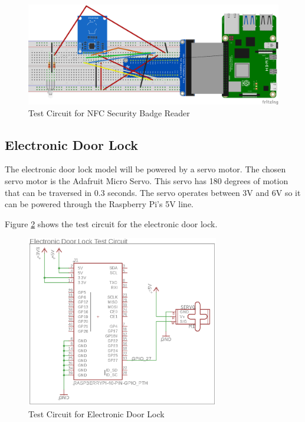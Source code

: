 \begin{figure}[!htb]
\centering
\includegraphics[width=\textwidth]{images/nfc-test-circuit.png}
\caption{Test Circuit for NFC Security Badge Reader}
\label{fig:nfc-test-circuit}
\end{figure}

\subsection{Electronic Door Lock}

The electronic door lock model will be powered by a servo motor. The chosen
servo motor is the Adafruit Micro Servo.  This servo has 180 degrees of motion
that can be traversed in 0.3 seconds.  The servo operates between 3V and 6V so
it can be powered through the Raspberry Pi's 5V line.

Figure \ref{fig:lock-test-circuit} shows the test circuit for the electronic
door lock.

\begin{figure}[!htb]
\centering
\includegraphics[width=0.75\textwidth]{images/lock-test-circuit.png}
\caption{Test Circuit for Electronic Door Lock}
\label{fig:lock-test-circuit}
\end{figure}

